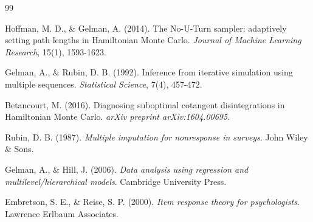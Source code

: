 \begin{thebibliography}{99}

Hoffman, M. D., \& Gelman, A. (2014). The No-U-Turn sampler: adaptively setting path lengths in Hamiltonian Monte Carlo. \textit{Journal of Machine Learning Research}, 15(1), 1593-1623.

Gelman, A., \& Rubin, D. B. (1992). Inference from iterative simulation using multiple sequences. \textit{Statistical Science}, 7(4), 457-472.

Betancourt, M. (2016). Diagnosing suboptimal cotangent disintegrations in Hamiltonian Monte Carlo. \textit{arXiv preprint arXiv:1604.00695}.

Rubin, D. B. (1987). \textit{Multiple imputation for nonresponse in surveys}. John Wiley \& Sons.

Gelman, A., \& Hill, J. (2006). \textit{Data analysis using regression and multilevel/hierarchical models}. Cambridge University Press.

Embretson, S. E., \& Reise, S. P. (2000). \textit{Item response theory for psychologists}. Lawrence Erlbaum Associates.

\end{thebibliography}
